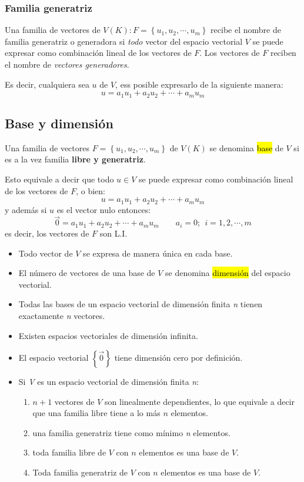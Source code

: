 \subsubsection{Familia generatriz}

Una familia de vectores de \(V(K): F=\left\{u_1,u_2,\cdots,u_m\right\}\) recibe el nombre de familia generatriz o generadora si \textit{todo} vector del espacio vectorial \(V\) se puede expresar como combinación lineal de los vectores de \(F\). Los vectores de \(F\) reciben el nombre de \textit{vectores generadores}.

Es decir, cualquiera sea \(u\) de \(V\), ess posible expresarlo de la siguiente manera:\[
  u = a_1 u_1 + a_2 u_2 + \cdots + a_m u_m
\]

\subsection{Base y dimensión}

Una familia de vectores \(F = \left\{u_1, u_2, \cdots, u_m\right\}\) de \(V(K)\) se denomina \hl{base} de \(V\) si es a la vez familia \textbf{libre y generatriz}.

Esto equivale a decir que todo \(u \in V\) se puede expresar como combinación lineal de los vectores de \(F\), o bien:
\[
  u = a_1 u_1 + a_2 u _2 + \cdots + a_m u_m
\] 
y además si \(u\) es el vector nulo entonces:
\[
  \vec{0} = a_1 u_1 + a_2 u_2 + \cdots + a_m u_m \qquad a_i = 0; ~~ i=1,2,\cdots,m
\]
es decir, los vectores de \(F\) son L.I.

\begin{itemize}
  \item Todo vector de \(V\) se expresa de manera única en cada base.
  \item El número de vectores de una base de \(V\) se denomina \hl{dimensión} del espacio vectorial.
  \item Todas las bases de un espacio vectorial de dimensión finita \textit{n} tienen exactamente \textit{n} vectores.
  \item Existen espacios vectoriales de dimensión infinita.
  \item El espacio vectorial \(\left\{\vec{0}\right\}\) tiene dimensión cero por definición.
  \item Si \textit{V} es un espacio vectorial de dimensión finita \textit{n}:
  \begin{enumerate}
    \item \(n+1\) vectores de \(V\) son linealmente dependientes, lo que equivale a decir que una familia libre tiene a lo más \(n\) elementos.
    \item una familia generatriz tiene como mínimo \textit{n} elementos.
    \item toda familia libre de \(V\) con \(n\) elementos es una base de \(V\).
    \item Toda familia generatriz de \(V\) con \(n\) elementos es una base de \(V\).
  \end{enumerate}
\end{itemize}

